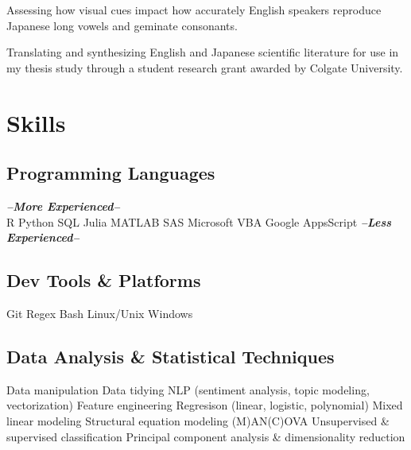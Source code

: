 \documentclass[letterpaper]{deedy-resume_sm} %
\begin{document}
\sectionspace %
\begin{tightitemize}
\item Assessing how visual cues impact how accurately English speakers reproduce Japanese long vowels and geminate consonants.
\end{tightitemize}
\sectionspace %
\begin{tightitemize}
\item Translating and synthesizing English and Japanese scientific literature for use in my thesis study through a student research grant awarded by Colgate University.
\end{tightitemize}
\sectionspace %

\section{Skills}
\subsection{Programming Languages}
{\footnotesize \textit{\textbf{--More Experienced--}}}\\
R \textbullet{} Python \textbullet{} SQL \textbullet{} Julia \textbullet{} MATLAB \textbullet{} SAS \textbullet{} Microsoft VBA \textbullet{} Google AppsScript
{\footnotesize \textit{\textbf{--Less Experienced--}}}\\
\sectionspace
\subsection{Dev Tools \& Platforms}
Git \textbullet{} Regex \textbullet{} Bash \textbullet{} Linux/Unix \textbullet{} Windows
\sectionspace
\subsection{Data Analysis \& Statistical Techniques}
Data manipulation \textbullet{} Data tidying \textbullet{} NLP (sentiment analysis, topic modeling, vectorization) \textbullet{} Feature engineering \textbullet{} Regresison (linear, logistic, polynomial) \textbullet{} Mixed linear modeling \textbullet{} Structural equation modeling \textbullet{} (M)AN(C)OVA \textbullet{} Unsupervised \& supervised classification \textbullet{} Principal component analysis \& dimensionality reduction\\
\sectionspace
\end{document}
